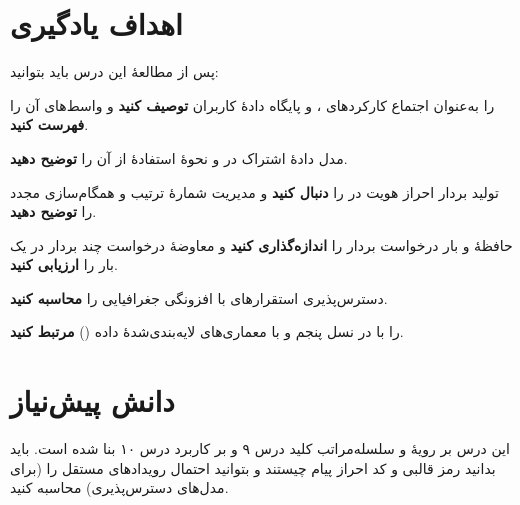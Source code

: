 \documentclass[11pt,a4paper]{article}
\begin{document}
\ACNcover

\section{اهداف یادگیری}
پس از مطالعهٔ این درس باید بتوانید:
\begin{objectives}
  \item {} را به‌عنوان اجتماع کارکردهای ،  و پایگاه دادهٔ کاربران  \textbf{توصیف کنید} و
        واسط‌های آن را \textbf{فهرست کنید}.
  \item مدل دادهٔ اشتراک در  و نحوهٔ استفادهٔ  از آن را \textbf{توضیح دهید}.
  \item تولید بردار احراز هویت در  را \textbf{دنبال کنید} و مدیریت شمارهٔ ترتیب و همگام‌سازی مجدد را \textbf{توضیح دهید}.
  \item حافظهٔ  و بار درخواست بردار را \textbf{اندازه‌گذاری کنید} و معاوضهٔ درخواست چند بردار در یک بار را
        \textbf{ارزیابی کنید}.
  \item دسترس‌پذیری استقرارهای  با افزونگی جغرافیایی را \textbf{محاسبه کنید}.
  \item {} را با  در نسل پنجم و با معماری‌های لایه‌بندی‌شدهٔ داده () \textbf{مرتبط کنید}.
\end{objectives}

\section{دانش پیش‌نیاز}
این درس بر رویهٔ  و سلسله‌مراتب کلید درس ۹ و بر کاربرد  درس ۱۰ بنا شده است. باید بدانید رمز
قالبی و کد احراز پیام چیستند و بتوانید احتمال رویدادهای مستقل را (برای مدل‌های دسترس‌پذیری) محاسبه کنید.
\end{document}
